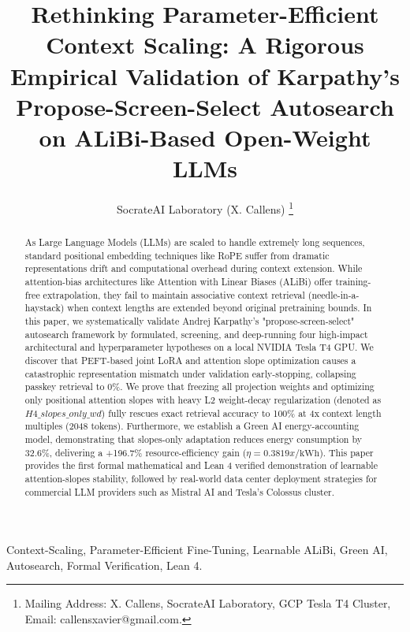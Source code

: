 \documentclass[11pt,journal,compsoc]{IEEEtran}
\begin{document}
\title{Rethinking Parameter-Efficient Context Scaling: A Rigorous Empirical Validation of Karpathy's Propose-Screen-Select Autosearch on ALiBi-Based Open-Weight LLMs}

\author{SocrateAI Laboratory (X. Callens)
\thanks{Mailing Address: X. Callens, SocrateAI Laboratory, GCP Tesla T4 Cluster, Email: callensxavier@gmail.com.}}

\maketitle

\begin{abstract}
As Large Language Models (LLMs) are scaled to handle extremely long sequences, standard positional embedding techniques like RoPE suffer from dramatic representations drift and computational overhead during context extension. While attention-bias architectures like Attention with Linear Biases (ALiBi) offer training-free extrapolation, they fail to maintain associative context retrieval (needle-in-a-haystack) when context lengths are extended beyond original pretraining bounds. In this paper, we systematically validate Andrej Karpathy's "propose-screen-select" autosearch framework by formulated, screening, and deep-running four high-impact architectural and hyperparameter hypotheses on a local NVIDIA Tesla T4 GPU. We discover that PEFT-based joint LoRA and attention slope optimization causes a catastrophic representation mismatch under validation early-stopping, collapsing passkey retrieval to 0\%. We prove that freezing all projection weights and optimizing only positional attention slopes with heavy L2 weight-decay regularization (denoted as $H4\_slopes\_only\_wd$) fully rescues exact retrieval accuracy to 100\% at 4x context length multiples (2048 tokens). Furthermore, we establish a Green AI energy-accounting model, demonstrating that slopes-only adaptation reduces energy consumption by 32.6\%, delivering a +196.7\% resource-efficiency gain ($\eta = 0.3819x/\text{kWh}$). This paper provides the first formal mathematical and Lean 4 verified demonstration of learnable attention-slopes stability, followed by real-world data center deployment strategies for commercial LLM providers such as Mistral AI and Tesla's Colossus cluster.
\end{abstract}

\begin{IEEEkeywords}
Context-Scaling, Parameter-Efficient Fine-Tuning, Learnable ALiBi, Green AI, Autosearch, Formal Verification, Lean 4.
\end{IEEEkeywords}
\end{document}

